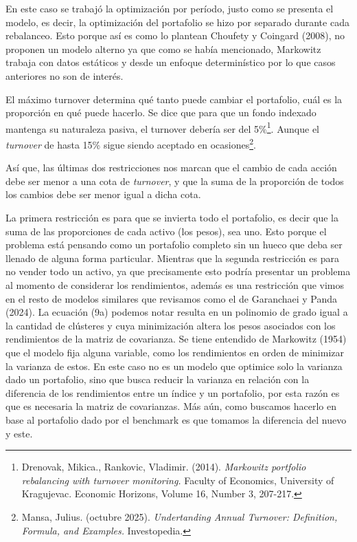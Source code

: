 \documentclass[
]{article}
\begin{document}
En este caso se trabajó la optimización por período, justo como se presenta el
modelo, es decir, la optimización del portafolio se hizo por separado durante cada
rebalanceo. Esto porque así es como lo plantean Choufety y Coingard (2008), no
proponen un modelo alterno ya que como se había mencionado, Markowitz trabaja
con datos estáticos y desde un enfoque determinístico por lo que casos anteriores
no son de interés.

El máximo turnover determina qué tanto puede cambiar el portafolio, cuál es la
proporción en qué puede hacerlo. Se dice que para que un fondo indexado
mantenga su naturaleza pasiva, el turnover debería ser del 5\%\footnote{Drenovak, Mikica.,
Rankovic, Vladimir. (2014). \emph{Markowitz portfolio rebalancing with turnover monitoring.}
Faculty of Economics, University of Kragujevac. Economic Horizons, Volume 16,
Number 3, 207-217.}. Aunque el \emph{turnover} de hasta 15\% sigue siendo aceptado en
ocasiones\footnote{Mansa, Julius. (octubre 2025). \emph{Undertanding Annual Turnover:
Definition, Formula, and Examples.} Investopedia.}.

Así que, las últimas dos restricciones nos marcan que el cambio de cada acción
debe ser menor a una cota de \emph{turnover}, y que la suma de la proporción de todos los
cambios debe ser menor igual a dicha cota.

La primera restricción es para que se invierta todo el portafolio, es decir que la suma
de las proporciones de cada activo (los pesos), sea uno. Esto porque el problema
está pensando como un portafolio completo sin un hueco que deba ser llenado de
alguna forma particular. Mientras que la segunda restricción es para no vender todo
un activo, ya que precisamente esto podría presentar un problema al momento de
considerar los rendimientos, además es una restricción que vimos en el resto de
modelos similares que revisamos como el de Garanchaei y Panda (2024).
La ecuación (9a) podemos notar resulta en un polinomio de
grado igual a la cantidad de clústeres y cuya minimización altera los pesos
asociados con los rendimientos de la matriz de covarianza. Se tiene entendido de
Markowitz (1954) que el modelo fija alguna variable, como los rendimientos en orden
de minimizar la varianza de estos.
En este caso no es un modelo que optimice solo la varianza dado un portafolio,
sino que busca reducir la varianza en relación con la diferencia de los rendimientos
entre un índice y un portafolio, por esta razón es que es necesaria la matriz de
covarianzas. Más aún, como buscamos hacerlo en base al portafolio dado por el
benchmark es que tomamos la diferencia del nuevo y este.
\end{document}
